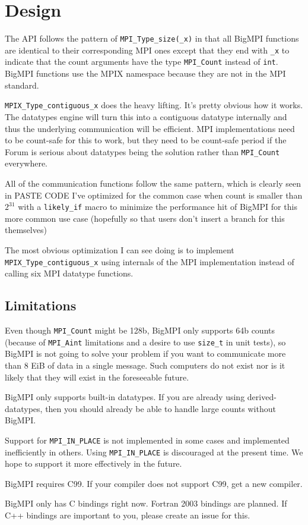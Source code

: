 
\section{Design}

The API follows the pattern of \texttt{MPI\_Type\_size(\_x)} in that all BigMPI
functions are identical to their corresponding MPI ones except that
they end with \texttt{\_x} to indicate that the count arguments have the type
\texttt{MPI\_Count} instead of \texttt{int}.
BigMPI functions use the MPIX namespace because they are not in the
MPI standard.


\texttt{MPIX\_Type\_contiguous\_x}
does the heavy lifting.  It's pretty obvious how it works.
The datatypes engine will turn this into a contiguous datatype internally 
and thus the underlying communication will be efficient.  
MPI implementations need to be count-safe for this to work, but they need
to be count-safe period if the Forum is serious about datatypes being
the solution rather than \texttt{MPI\_Count} everywhere.

All of the communication functions follow the same pattern, which is
clearly seen in PASTE CODE
I've optimized for the common case when count is smaller than $2^{31}$ 
with a \texttt{likely\_if} macro to minimize the performance hit of BigMPI
for this more common use case
(hopefully so that users don't insert a branch for this themselves)

The most obvious optimization I can see doing is to implement
\texttt{MPIX\_Type\_contiguous\_x} using internals of the MPI implementation 
instead of calling six MPI datatype functions.

\subsection{Limitations}

Even though \texttt{MPI\_Count} might be 128b, BigMPI only supports
64b counts (because of \texttt{MPI\_Aint} limitations and a desire to use \texttt{size\_t}
in unit tests), so BigMPI is not going to solve your problem if you
want to communicate more than 8 EiB of data in a single message.
Such computers do not exist nor is it likely that they will exist
in the foreseeable future.

BigMPI only supports built-in datatypes.  If you are already using
derived-datatypes, then you should already be able to handle large
counts without BigMPI.

Support for \texttt{MPI\_IN\_PLACE} is not implemented in some cases and
implemented inefficiently in others.
Using \texttt{MPI\_IN\_PLACE} is discouraged at the present time.
We hope to support it more effectively in the future.

BigMPI requires C99.  If your compiler does not support C99, get a
new compiler.

BigMPI only has C bindings right now.
Fortran 2003 bindings are planned.
If C++ bindings are important to you, please create an issue for this.